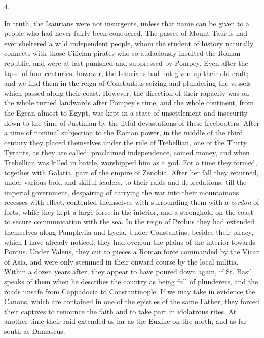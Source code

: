 4.

In truth, the Isaurians were not insurgents, unless that name can
be given to a people who had never fairly been conquered. The passes
of Mount Taurus had ever sheltered a wild independent people, whom the
student of history naturally connects with those Cilician pirates who
so audaciously insulted the Roman republic, and were at last punished
and suppressed by Pompey. Even after the lapse of four centuries,
however, the Isaurians had not given up their old craft; and we find
them in the reign of Constantius seizing and plundering the
vessels which passed along their coast. However, the direction of
their rapacity was on the whole turned landwards after Pompey's time;
and the whole continent, from the Egean almost to Egypt, was kept in a
state of unsettlement and insecurity down to the time of Justinian by
the fitful devastations of these freebooters. After a time of nominal
subjection to the Roman power, in the middle of the third century they
placed themselves under the rule of Trebellian, one of the Thirty
Tyrants, as they are called; proclaimed independence, coined money,
and when Trebellian was killed in battle, worshipped him as a god. For
a time they formed, together with Galatia, part of the empire of
Zenobia. After her fall they returned, under various bold and skilful
leaders, to their raids and depredations; till the imperial
government, despairing of carrying the war into their mountainous
recesses with effect, contented themselves with surrounding them with
a \emph{cordon} of forts, while they kept a large force in the
interior, and a stronghold on the coast to secure communication with
the sea. In the reign of Probus they had extended themselves along
Pamphylia and Lycia. Under Constantius, besides their piracy, which I
have already noticed, they had overrun the plains of the interior
towards Pontus. Under Valens, they cut to pieces a Roman force
commanded by the Vicar of Asia, and were only stemmed in their onward
course by the local militia. Within a dozen years after, they appear
to have poured down again, if St. Basil speaks of them when he
describes the country as being full of plunderers, and the roads
unsafe from Cappadocia to Constantinople. If we may take in evidence
the Canons, which are contained in one of the epistles of the same
Father, they forced their captives to renounce the faith and to take
part in idolatrous rites. At another time their raid extended as
far as the Euxine on the north, and as far south as Damascus.

